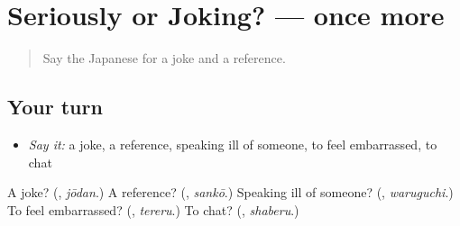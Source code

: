 \section[(dialogue)]{Seriously or Joking? — once more}

\label{lesson:JA-R371-review-final-371}



\begin{quote}
Say the Japanese for a joke and a reference.
\end{quote}

\subsection*{Your turn}
\begin{itemize}
\raggedright
  \item \emph{Say it:} a joke, a reference, speaking ill of someone, to feel embarrassed, to chat
\end{itemize}

\begin{tcolorbox}[breakable,colback=teal!4,colframe=teal!35!black,title={Before you move on}]
A joke? (\textbf{}, \emph{jōdan}.) A reference? (\textbf{}, \emph{sankō}.) Speaking ill of someone? (\textbf{}, \emph{waruguchi}.) To feel embarrassed? (\textbf{}, \emph{tereru}.) To chat? (\textbf{}, \emph{shaberu}.)
\end{tcolorbox}
